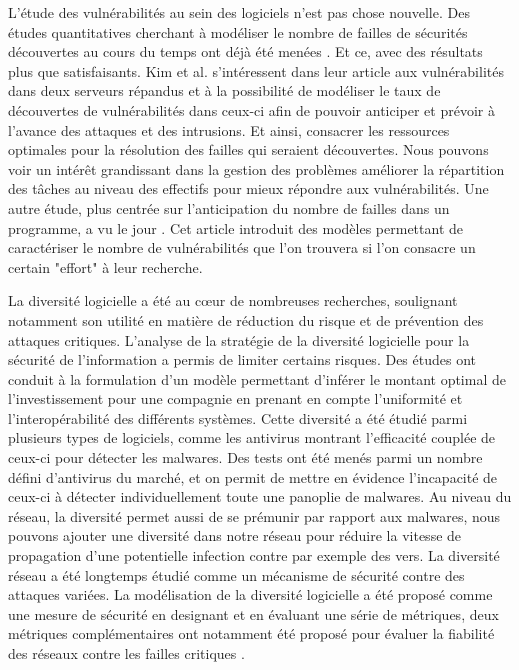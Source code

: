 L'étude des vulnérabilités au sein des logiciels n'est pas chose nouvelle. Des études quantitatives cherchant à modéliser le
nombre de failles de sécurités découvertes au cours du temps ont déjà été menées \cite{vulnerabilityDiscovery}. Et ce, avec des
résultats plus que satisfaisants. Kim et al. s'intéressent dans leur article aux vulnérabilités dans deux serveurs répandus et à la possibilité de modéliser le taux de découvertes de vulnérabilités dans ceux-ci
afin de pouvoir anticiper et prévoir à l'avance des attaques et des intrusions. Et ainsi, consacrer les ressources optimales pour la résolution des failles qui
seraient découvertes. Nous pouvons voir un intérêt grandissant dans la gestion des problèmes améliorer la répartition des tâches au niveau des effectifs pour mieux répondre aux vulnérabilités. Une autre étude, plus centrée sur l'anticipation du
nombre de failles dans un programme, a vu le jour \cite{assessingVulnerabilities}. Cet article introduit des modèles
permettant de caractériser le nombre de vulnérabilités que l'on trouvera si l'on consacre un certain "effort" à leur recherche.

La diversité logicielle a été au cœur de nombreuses recherches, soulignant notamment son utilité en matière de réduction du risque \cite{softwareDiversityStateOfTheArt} et de prévention des attaques critiques. L'analyse de la stratégie de la diversité logicielle pour la sécurité de l’information a permis de limiter certains risques. Des études ont conduit à la formulation d'un modèle permettant d'inférer le montant optimal de l’investissement pour une compagnie en prenant en compte l’uniformité et l’interopérabilité des différents systèmes\cite{informationSecurity}. 
Cette diversité a été étudié parmi plusieurs types de logiciels, comme les antivirus \cite{DiversityForSecurityAntivirus}montrant l’efficacité couplée de ceux-ci pour détecter les malwares. Des tests ont été menés parmi un nombre défini d'antivirus du marché, et on permit de mettre en évidence l'incapacité de ceux-ci à détecter individuellement toute une panoplie de malwares.
 Au niveau du réseau, la diversité permet aussi de se prémunir par rapport aux malwares, nous pouvons ajouter une diversité dans notre réseau pour réduire la vitesse de propagation d’une potentielle infection \cite{OptimisingNetwork} contre par exemple des vers. La diversité réseau a été longtemps étudié comme un mécanisme de sécurité contre des attaques variées. La modélisation de la diversité logicielle a été proposé comme une mesure de sécurité en designant et en évaluant une série de métriques, deux métriques complémentaires ont notamment été proposé pour évaluer la fiabilité des réseaux contre les failles critiques \cite{networkDiversity}.

